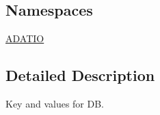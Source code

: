 \subsection*{Namespaces}
\begin{DoxyCompactItemize}
\item 
 \mbox{\hyperlink{namespaceADATIO}{A\+D\+A\+T\+IO}}
\end{DoxyCompactItemize}


\subsection{Detailed Description}
Key and values for DB. 

